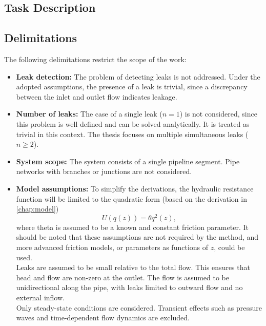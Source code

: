 \subsection{Task Description} \label{sec:task_desc}


\subsection{Delimitations}

The following delimitations restrict the scope of the work:

\begin{itemize}

\item \textbf{Leak detection:}
The problem of detecting leaks is not addressed. Under the adopted assumptions, the presence of a leak is trivial, since a discrepancy between the inlet and outlet flow indicates leakage.\\

\item \textbf{Number of leaks:}
The case of a single leak ($n = 1$) is not considered, since this problem is well defined and can be solved analytically. It is treated as trivial in this context. The thesis focuses on multiple simultaneous leaks ($n \geq 2$).\\

\item \textbf{System scope:}
The system consists of a single pipeline segment. Pipe networks with branches or junctions are not considered.\\

\item \textbf{Model assumptions:}
To simplify the derivations, the hydraulic resistance function will be limited to the quadratic form (based on the derivation in \autoref{chap:model})
\[ U(q(z)) = \theta q^2(z), \]
where \gls{theta} is assumed to be a known and constant friction parameter. It should be noted that these assumptions are not required by the method, and more advanced friction models, or parameters as functions of $z$, could be used.\\

Leaks are assumed to be small relative to the total flow. This ensures that head and flow are non-zero at the outlet. The flow is assumed to be unidirectional along the pipe, with leaks limited to outward flow and no external inflow.\\

Only steady-state conditions are considered. Transient effects such as pressure waves and time-dependent flow dynamics are excluded.\\


\end{itemize}
